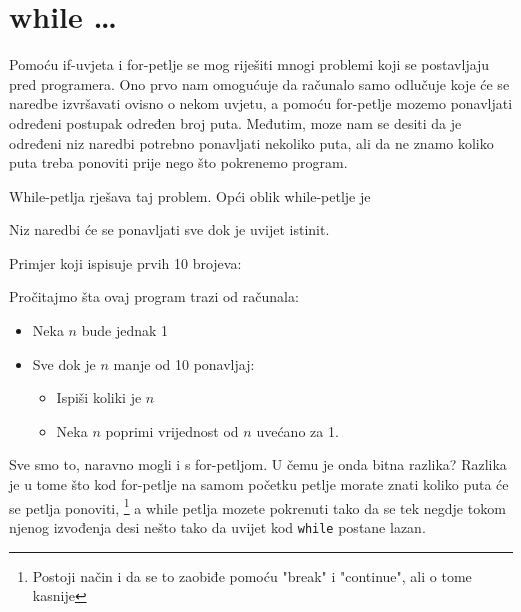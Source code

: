 \section{while \dots}

Pomoću if-uvjeta i for-petlje se mog riješiti mnogi problemi koji se
postavljaju pred programera. Ono prvo nam omogućuje da računalo samo
odlučuje koje će se naredbe izvršavati ovisno o nekom uvjetu, a
pomoću for-petlje mozemo ponavljati određeni postupak određen broj
puta. Međutim, moze nam se desiti da je određeni niz naredbi potrebno
ponavljati nekoliko puta, ali da ne znamo koliko puta treba ponoviti prije nego
što pokrenemo program. 

While-petlja rješava taj problem. Opći oblik while-petlje je


Niz naredbi će se ponavljati sve dok je uvijet istinit. 

Primjer koji ispisuje prvih 10 brojeva:


Pročitajmo šta ovaj program trazi od računala:
\begin{itemize}
	\item Neka $n$ bude jednak 1
	\item Sve dok je $n$ manje od 10 ponavljaj:
	\begin{itemize}
		\item Ispiši koliki je $n$
		\item Neka $n$ poprimi vrijednost od $n$ uvećano za 1.
	\end{itemize}
\end{itemize}

Sve smo to, naravno mogli i s for-petljom. U čemu je onda bitna razlika? Razlika
je u tome što kod for-petlje na samom početku petlje morate znati koliko
puta će se petlja ponoviti,
\footnote{Postoji način i da se to zaobiđe pomoću "break" i "continue", ali o tome kasnije}
a while petlja mozete pokrenuti tako da se tek negdje tokom njenog izvođenja
desi nešto tako da uvijet kod \verb"while" postane lazan.

